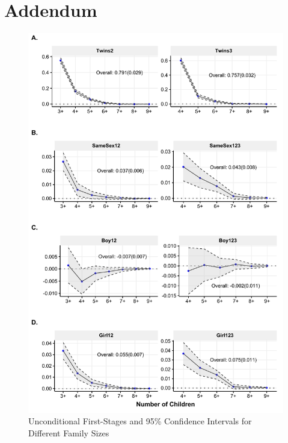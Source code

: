 \documentclass[11pt,a4paper]{article}
\begin{document}
\section*{Addendum}
%
\pagebreak
\begin{figure}[ht]
\centering
\caption{\label{fig:02}Unconditional First-Stages and 95\% Confidence Intervals for Different Family Sizes}
\includegraphics[width=\textwidth]{figures/acrs.pdf}
\end{figure}

\end{document}
